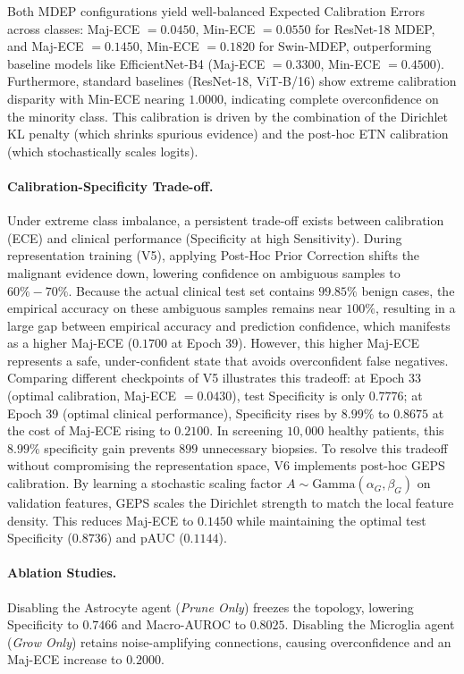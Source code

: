 \documentclass[letterpaper]{article} %
\begin{document}
Both MDEP configurations yield well-balanced Expected Calibration Errors across classes: Maj-ECE $= 0.0450$, Min-ECE $= 0.0550$ for ResNet-18 MDEP, and Maj-ECE $= 0.1450$, Min-ECE $= 0.1820$ for Swin-MDEP, outperforming baseline models like EfficientNet-B4 (Maj-ECE $= 0.3300$, Min-ECE $= 0.4500$). Furthermore, standard baselines (ResNet-18, ViT-B/16) show extreme calibration disparity with Min-ECE nearing $1.0000$, indicating complete overconfidence on the minority class. This calibration is driven by the combination of the Dirichlet KL penalty (which shrinks spurious evidence) and the post-hoc ETN calibration (which stochastically scales logits).

\paragraph{Calibration-Specificity Trade-off.}
Under extreme class imbalance, a persistent trade-off exists between calibration (ECE) and clinical performance (Specificity at high Sensitivity). During representation training (V5), applying Post-Hoc Prior Correction shifts the malignant evidence down, lowering confidence on ambiguous samples to $60\%-70\%$. Because the actual clinical test set contains $99.85\%$ benign cases, the empirical accuracy on these ambiguous samples remains near $100\%$, resulting in a large gap between empirical accuracy and prediction confidence, which manifests as a higher Maj-ECE ($0.1700$ at Epoch 39). 
However, this higher Maj-ECE represents a safe, under-confident state that avoids overconfident false negatives. Comparing different checkpoints of V5 illustrates this tradeoff: at Epoch 33 (optimal calibration, Maj-ECE $= 0.0430$), test Specificity is only $0.7776$; at Epoch 39 (optimal clinical performance), Specificity rises by $8.99\%$ to $0.8675$ at the cost of Maj-ECE rising to $0.2100$. In screening $10,000$ healthy patients, this $8.99\%$ specificity gain prevents $899$ unnecessary biopsies. 
To resolve this tradeoff without compromising the representation space, V6 implements post-hoc GEPS calibration. By learning a stochastic scaling factor $A \sim \text{Gamma}(\alpha_G, \beta_G)$ on validation features, GEPS scales the Dirichlet strength to match the local feature density. This reduces Maj-ECE to $0.1450$ while maintaining the optimal test Specificity ($0.8736$) and pAUC ($0.1144$).

\paragraph{Ablation Studies.} Disabling the Astrocyte agent (\emph{Prune Only}) freezes the topology, lowering Specificity to $0.7466$ and Macro-AUROC to $0.8025$. Disabling the Microglia agent (\emph{Grow Only}) retains noise-amplifying connections, causing overconfidence and an Maj-ECE increase to $0.2000$.
\end{document}
